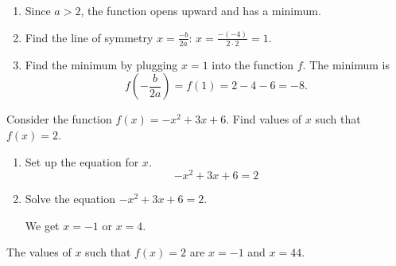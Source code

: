 	\begin{solution}\mbox{}\vspace{-0.25em}
		\begin{enumerate}[label={\textbf{\textup{Step \arabic*.}}~}]
			\item Since $a>2$, the function opens upward and has a minimum.
			\item Find the line of symmetry $x=\frac{-b}{2a}$:
			      $x=\frac{-(-4)}{2\cdot 2}=1$.
			\item Find the minimum by plugging $x=1$ into the function $f$.
				  The minimum is
				  $$
				  f(-\frac{b}{2a})=f(1)=2-4-6=-8.
				  $$
		\end{enumerate}
	\end{solution}

	\begin{example}
		Consider the function $f(x)=-x^2+3x+6$. Find values of $x$ such that $f(x)=2$.
	\end{example}
	\begin{solution}\mbox{}\vspace{-0.25em}
		\begin{enumerate}[label={\textbf{\textup{Step \arabic*.}}~}]
			\item Set up the equation for $x$.
			      \[-x^2+3x+6=2\]
			\item Solve the equation $-x^2+3x+6=2$.

			      We get $x=-1$ or $x=4$.
		\end{enumerate}
		The values of $x$ such that $f(x)=2$ are $x=-1$ and $x=44$.
	\end{solution}

